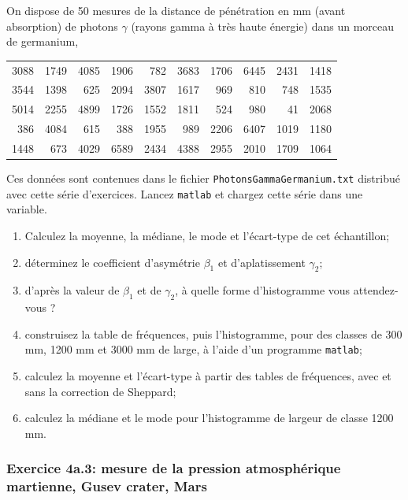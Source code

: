 \documentclass[main.tex]{subfiles}
\begin{document}
On dispose de 50 mesures de la distance de pénétration en mm (avant absorption) de photons $\gamma$ (rayons gamma à très haute énergie) dans un morceau de germanium,
\begin{center}
    \begin{tabular}{|r|r|r|r|r|r|r|r|r|r|}
        3088 & 1749 & 4085 & 1906 & 782  & 3683 & 1706 & 6445 & 2431 & 1418 \\
        3544 & 1398 & 625  & 2094 & 3807 & 1617 & 969  & 810  & 748  & 1535 \\
        5014 & 2255 & 4899 & 1726 & 1552 & 1811 & 524  & 980  & 41   & 2068 \\
        386  & 4084 & 615  & 388  & 1955 & 989  & 2206 & 6407 & 1019 & 1180 \\
        1448 & 673  & 4029 & 6589 & 2434 & 4388 & 2955 & 2010 & 1709 & 1064
    \end{tabular}
\end{center}
Ces données sont contenues dans le fichier \texttt{PhotonsGammaGermanium.txt} distribué avec cette série d'exercices. Lancez \texttt{matlab} et chargez cette série dans une variable.
\begin{enumerate}
    \item Calculez la moyenne, la médiane, le mode et l'écart-type de cet échantillon;
    \item déterminez le coefficient d'asymétrie $\beta_1$ et d'aplatissement $\gamma_2$;
    \item d'après la valeur de $\beta_1$ et de $\gamma_2$, à quelle forme d'histogramme vous attendez-vous ?
    \item construisez la table de fréquences, puis l'histogramme, pour des classes de 300 mm, 1200 mm et 3000 mm de large, à l'aide d'un programme \texttt{matlab};
    \item calculez la moyenne et l'écart-type à partir des tables de fréquences, avec et sans la correction de Sheppard;
    \item calculez la médiane et le mode pour l'histogramme de largeur de classe 1200 mm.
\end{enumerate}

\subsubsection{Exercice 4a.3: mesure de la pression atmosphérique martienne, Gusev crater, Mars}
\end{document}
